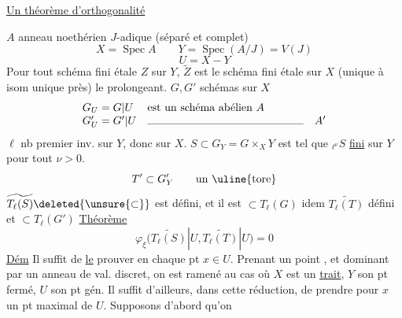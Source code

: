 \uline{Un théorème d'orthogonalité}

$A$ anneau noethérien $J$-adique (séparé et complet)
\[
X=\operatorname{Spec}A\qquad
Y=\operatorname{Spec}(A/J)=V(J)
\]
\[
U=X-Y
\]
Pour tout schéma fini étale $Z$ sur $Y$, $\widetilde Z$ est le schéma fini étale sur $X$ (unique à isom unique près) le prolongeant.
$G,G'$ schémas    sur $X$ 
\[
\begin{array}{ll}
G_U=G|U&\text{est un schéma abélien }A\\
G'_U=G'|U&\text{\rule{5cm}{.3pt}}\quad A'
\end{array}
\]
$\ell$  nb premier inv. sur $Y$, donc sur $X$.
$S\subset G_Y=G\times_XY$ est  tel que ${}_{\ell^\nu}S$ \uline{fini} sur $Y$ pour tout $\nu>0$.
\[
T'\subset G'_Y\qquad\text{un \uline{tore}}
\]
$\widetilde{T_\ell(S)}\deleted{\unsure{\subset}}$ est défini, et il est $\subset T_\ell(G)$
idem $\widetilde{T_\ell(T)}$ défini et $\subset T_\ell(G')$
\uline{Théorème}
\[
\varphi_\xi\bigl(\widetilde{T_\ell(S)}|U,\widetilde{T_\ell(T)}|U\bigr)=0
\]
\uline{Dém} Il suffit de \uline{le} prouver en chaque pt $x\in U$.
Prenant un point  , et dominant par un anneau de val. discret, on est ramené au cas où $X$ est un \uline{trait}, $Y$ son pt fermé, $U$ son pt gén. Il suffit d'ailleurs, dans cette réduction, de prendre pour $x$ un pt maximal de $U$. Supposons  d'abord qu'on
